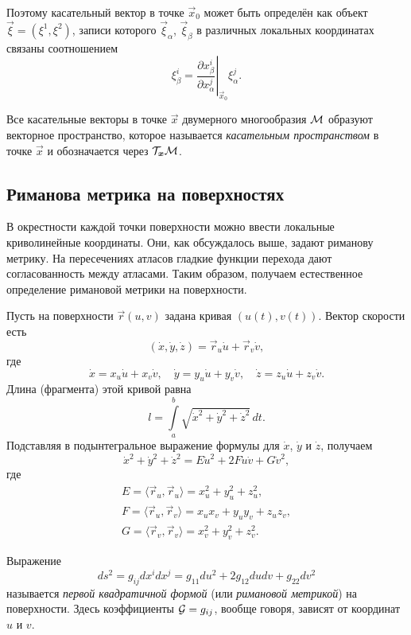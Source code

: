 Поэтому касательный вектор в точке $\vec{x}_0$ может быть определён как объект $\vec{\xi} = (\xi^1, \xi^2)$, записи которого $\vec{\xi}_\alpha$, $\vec{\xi}_\beta$ в различных локальных координатах связаны соотношением
\[
	\xi_\beta^i = \left.\frac{\partial x_\beta^i}{\partial x_\alpha^j}\right|_{\vec{x}_0}\xi^j_\alpha.
\]

\begin{definition}
	Все касательные векторы в точке $\vec{x}$ двумерного многообразия $\mathcal{M}$ образуют векторное пространство, которое называется \textit{касательным пространством} в точке $\vec{x}$ и обозначается через $\mathcal{T}_{\boldsymbol{x}}\mathcal{M}$.
\end{definition}

\subsection{Риманова метрика на поверхностях}

В окрестности каждой точки поверхности можно ввести локальные криволинейные координаты. Они, как обсуждалось выше, задают риманову метрику. На пересечениях атласов гладкие функции перехода дают согласованность между атласами. Таким образом, получаем естественное определение римановой метрики на поверхности.

Пусть на поверхности $\vec{r}(u, v)$ задана кривая $(u(t), v(t))$. Вектор скорости есть
\[
	(\dot{x}, \dot{y}, \dot{z}) = \vec{r}_u\dot{u} + \vec{r}_v\dot{v},
\]
где
\[
	\dot{x} = x_u\dot{u} + x_v\dot{v},\quad
	\dot{y} = y_u\dot{u} + y_v\dot{v},\quad
	\dot{z} = z_u\dot{u} + z_v\dot{v}.
\]
Длина (фрагмента) этой кривой равна
\[
	l = \int\limits_a^b\sqrt{\dot{x}^2 + \dot{y}^2 + \dot{z}^2}\,dt.
\]
Подставляя в подынтегральное выражение формулы для $\dot{x}$, $\dot{y}$ и $\dot{z}$, получаем
\[
	\dot{x}^2 + \dot{y}^2 + \dot{z}^2 = E\dot{u}^2 + 2F\dot{u}\dot{v} + G\dot{v}^2,
\]
где
\begin{gather*}
	E = \langle\vec{r}_u, \vec{r}_u\rangle = x_u^2 + y_u^2 + z_u^2,\\
	F = \langle\vec{r}_u, \vec{r}_v\rangle = x_ux_v + y_uy_v + z_uz_v,\\
	G = \langle\vec{r}_v, \vec{r}_v\rangle = x_v^2 + y_v^2 + z_v^2.
\end{gather*}

\begin{definition}
	Выражение
	\[
		ds^2 = g_{ij}dx^idx^j = g_{11}du^2 + 2g_{12}dudv + g_{22}dv^2
	\]
	называется \textit{первой квадратичной формой} (или \textit{римановой метрикой}) на поверхности. Здесь коэффициенты $\mathcal{G} = g_{ij}$, вообще говоря, зависят от координат $u$ и $v$.
\end{definition}

